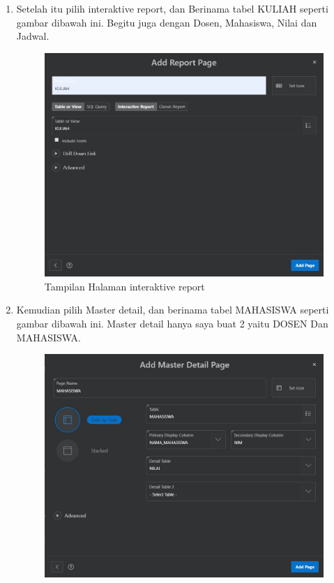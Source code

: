 \begin{enumerate}
\item Setelah itu pilih interaktive report, dan Berinama tabel KULIAH seperti gambar dibawah ini. Begitu juga dengan Dosen, Mahasiswa, Nilai dan Jadwal.
    \begin{figure}[!htbp]
    \begin{center}
    \includegraphics[scale=0.6]{section/ICA25.JPG}
    \caption{Tampilan Halaman interaktive report}
    \end{center}   
    \end{figure}  
\item Kemudian pilih Master detail, dan berinama tabel MAHASISWA seperti gambar dibawah ini. Master detail hanya saya buat 2 yaitu DOSEN Dan MAHASISWA. \vspace{8cm}
    \begin{figure}[!htbp]
    \begin{center}
    \includegraphics[scale=0.5]{section/ICA21.JPG}

\end{center}
\end{figure}
\end{enumerate}
